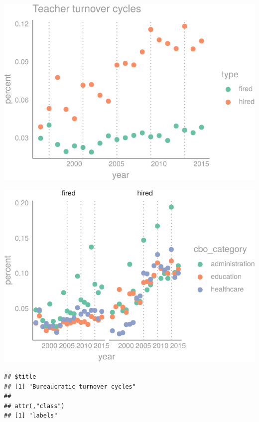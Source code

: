 \documentclass[12pt,]{article}
\begin{document}
\begin{center}\includegraphics{dissertation_files/figure-latex/unnamed-chunk-15-1} \end{center}

\begin{center}\includegraphics{dissertation_files/figure-latex/unnamed-chunk-16-1} \end{center}

\begin{verbatim}
## $title
## [1] "Bureaucratic turnover cycles"
## 
## attr(,"class")
## [1] "labels"
\end{verbatim}
\end{document}
